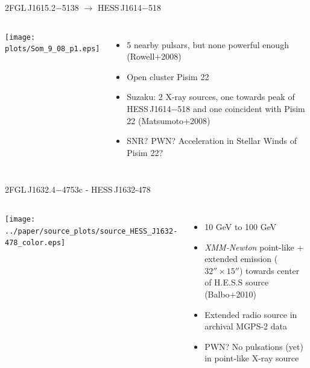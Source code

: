 \documentclass[12pt]{beamer}
\begin{document}
\begin{frame}{2FGL\,J1615.2$-$5138 $\rightarrow$ HESS\,J1614$-$518}

  \begin{columns}
    \texttt{[image: plots/Som\_9\_08\_p1.eps]}
    \begin{itemize}
      \item 5 nearby pulsars, but none powerful enough (Rowell+2008)
      \item Open cluster Pisim 22 
      \item Suzaku: 2 X-ray sources, one towards peak 
        of HESS\,J1614$-$518 and one coincident with Pisim 22
        (Matsumoto+2008)
      \item SNR? PWN? Acceleration in Stellar Winds of Pisim 22?
    \end{itemize}
  \end{columns}
\end{frame}



\begin{frame}{2FGL\,J1632.4$-$4753c - HESS\,J1632-478}
  \begin{columns}
    \texttt{[image: ../paper/source\_plots/source\_HESS\_J1632-478\_color.eps]}
    \begin{itemize}
      \item 10 GeV to 100 GeV
      \item  {\em XMM-Newton} point-like + extended emission
        ($32''\times15''$)
        towards center of H.E.S.S source (Balbo+2010)
      \item Extended radio source in archival MGPS-2 data
      \item PWN? No pulsations (yet) in point-like X-ray source
    \end{itemize}
  \end{columns}
\end{frame}
\end{document}
